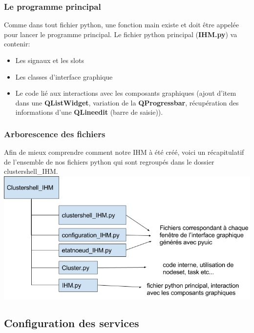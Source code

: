 \documentclass[a4paper,11pt]{article}
\begin{document}
\subsubsection{Le programme principal}

Comme dans tout fichier python, une fonction main existe et doit être appelée pour lancer le programme principal. Le fichier python principal (\textbf{IHM.py}) va contenir:
\begin{itemize}
\item Les signaux et les slots
\item Les classes d'interface graphique
\item Le code lié aux interactions avec les composants graphiques (ajout d'item dans une \textbf{QListWidget}, variation de la \textbf{QProgressbar}, récupération des informations d'une \textbf{QLineedit} (barre de saisie)).
\end{itemize}
\subsubsection{Arborescence des fichiers}
Afin de mieux comprendre comment notre IHM à été créé, voici un récapitulatif de l'ensemble de nos fichiers python qui sont regroupés dans le dossier clustershell\_IHM.\\
\includegraphics[scale=0.5]{arborescence_fichiers_IHM.jpg} 

\subsection{Configuration des services}
\end{document}
